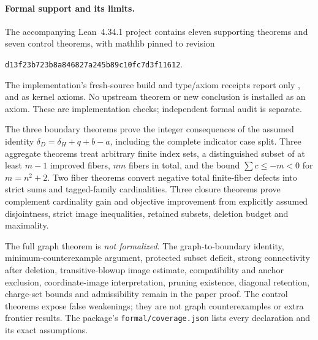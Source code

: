 \paragraph{Formal support and its limits.}
The accompanying Lean~4.34.1 project contains eleven supporting theorems
and seven control theorems, with mathlib pinned to revision
\begin{center}\small\texttt{d13f23b723b8a846827a245b89c10fc7d3f11612}.\end{center}
The implementation's fresh-source build and type/axiom receipts report only
,  and  as kernel
axioms. No upstream theorem or new conclusion is installed as an axiom.
These are implementation checks; independent formal audit is separate.

The three boundary theorems prove the integer consequences of the assumed
identity $\delta_D=\delta_H+q+b-a$, including the complete indicator case
split. Three aggregate theorems treat arbitrary finite index sets, a
distinguished subset of at least $m-1$ improved fibers, $nm$ fibers in total,
and the bound $\sum c\leq-m<0$ for $m=n^2+2$. Two fiber theorems convert
negative total finite-fiber defects into strict sums and tagged-family
cardinalities. Three closure theorems prove complement cardinality gain and
objective improvement from explicitly assumed disjointness, strict image
inequalities, retained subsets, deletion budget and maximality.

The full graph theorem is \emph{not formalized}. The graph-to-boundary
identity, minimum-counterexample argument, protected subset deficit,
strong connectivity after deletion, transitive-blowup image estimate,
compatibility and anchor exclusion, coordinate-image interpretation,
pruning existence, diagonal retention, charge-set bounds and admissibility
remain in the paper proof. The control theorems expose false weakenings;
they are not graph counterexamples or extra frontier results. The package's
\texttt{formal/coverage.json} lists every declaration and its exact assumptions.

